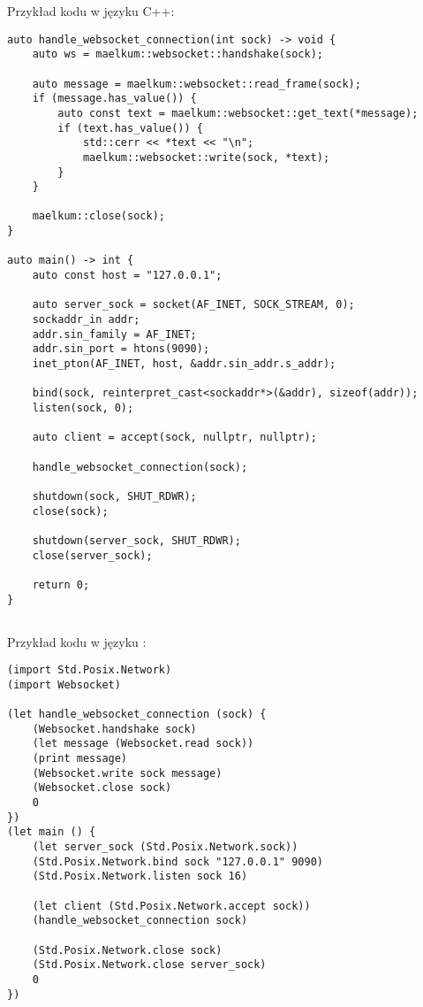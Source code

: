 Przykład kodu w języku C++:
\begin{small}
\begin{lstlisting}
auto handle_websocket_connection(int sock) -> void {
    auto ws = maelkum::websocket::handshake(sock);

    auto message = maelkum::websocket::read_frame(sock);
    if (message.has_value()) {
        auto const text = maelkum::websocket::get_text(*message);
        if (text.has_value()) {
            std::cerr << *text << "\n";
            maelkum::websocket::write(sock, *text);
        }
    }

    maelkum::close(sock);
}

auto main() -> int {
    auto const host = "127.0.0.1";

    auto server_sock = socket(AF_INET, SOCK_STREAM, 0);
    sockaddr_in addr;
    addr.sin_family = AF_INET;
    addr.sin_port = htons(9090);
    inet_pton(AF_INET, host, &addr.sin_addr.s_addr);

    bind(sock, reinterpret_cast<sockaddr*>(&addr), sizeof(addr));
    listen(sock, 0);

    auto client = accept(sock, nullptr, nullptr);

    handle_websocket_connection(sock);

    shutdown(sock, SHUT_RDWR);
    close(sock);

    shutdown(server_sock, SHUT_RDWR);
    close(server_sock);

    return 0;
}
\end{lstlisting}
\end{small}

\subsection{\ViuAct}

Przykład kodu w języku \ViuAct:
\begin{small}
\begin{lstlisting}
(import Std.Posix.Network)
(import Websocket)

(let handle_websocket_connection (sock) {
    (Websocket.handshake sock)
    (let message (Websocket.read sock))
    (print message)
    (Websocket.write sock message)
    (Websocket.close sock)
    0
})
(let main () {
    (let server_sock (Std.Posix.Network.sock))
    (Std.Posix.Network.bind sock "127.0.0.1" 9090)
    (Std.Posix.Network.listen sock 16)

    (let client (Std.Posix.Network.accept sock))
    (handle_websocket_connection sock)

    (Std.Posix.Network.close sock)
    (Std.Posix.Network.close server_sock)
    0
})
\end{lstlisting}
\end{small}

